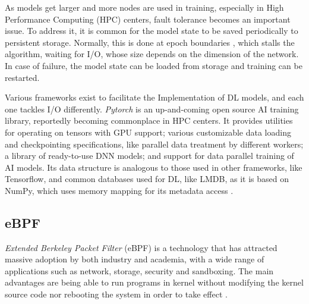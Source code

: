 \documentclass[conference]{IEEEtran}
\begin{document}
    As models get larger and more nodes are used in training, especially in High Performance Computing (HPC) centers, fault tolerance becomes an important issue. To address it, it is common for the model state to be saved periodically to persistent storage. Normally, this is done at epoch boundaries \cite{checkfreq}, which stalls the algorithm, waiting for I/O, whose size depends on the dimension of the network. In case of failure, the model state can be loaded from storage and training can be restarted.

    Various frameworks exist to facilitate the Implementation of DL models, and each one tackles I/O differently. \textit{Pytorch} \cite{pytorch} is an up-and-coming open source AI training library, reportedly becoming commonplace in HPC centers. It provides utilities for operating on tensors with GPU support; various customizable data loading and checkpointing specifications, like parallel data treatment by different workers; a library of ready-to-use DNN models; and support for data parallel training of AI models. Its data structure is analogous to those used in other frameworks, like Tensorflow, and common databases used for DL, like LMDB, as it is based on NumPy, which uses memory mapping for its metadata access \cite{LMDB}.

    \subsection{eBPF}

    \textit{Extended Berkeley Packet Filter} (eBPF) is a technology that has attracted massive adoption by both industry and academia, with a wide range of applications such as network, storage, security and sandboxing. 
    The main advantages are being able to run programs in kernel without modifying the kernel source code nor rebooting the system in order to take effect \cite{eBPFSurvey}.
\end{document}
